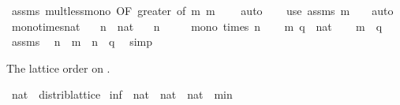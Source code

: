 \begin{isabellebody}
\ assms\ mult{\isacharunderscore}{\kern0pt}less{\isacharunderscore}{\kern0pt}mono{}\ {\isacharbrackleft}{\kern0pt}OF\ greater{\isacharcomma}{\kern0pt}\ of\ m{\isacharbrackright}{\kern0pt}\ {\isacartoucheopen}m\ {\isasymnoteq}\ {}{\isacartoucheclose}\ \isamarkupfalse%
\ auto\isanewline
\ \ \isamarkupfalse%
\ {\isacharparenleft}{\kern0pt}use\ assms\ {\isacartoucheopen}m\ {\isasymnoteq}\ {}{\isacartoucheclose}\ \ auto{\isacharparenright}{\kern0pt}\isanewline
{}\isamarkupfalse%
%
\endisatagproof
{\isafoldproof}%
%
\isadelimproof
\isanewline
%
\endisadelimproof
\isanewline
{}\isamarkupfalse%
\ mono{\isacharunderscore}{\kern0pt}times{\isacharunderscore}{\kern0pt}nat{\isacharcolon}{\kern0pt}\isanewline
\ \ \ n\ {\isacharcolon}{\kern0pt}{\isacharcolon}{\kern0pt}\ nat\isanewline
\ \ \ {\isachardoublequoteopen}n\ {\isachargreater}{\kern0pt}\ {}{\isachardoublequoteclose}\isanewline
\ \ \ {\isachardoublequoteopen}mono\ {\isacharparenleft}{\kern0pt}times\ n{\isacharparenright}{\kern0pt}{\isachardoublequoteclose}\isanewline
%
\isadelimproof
%
\endisadelimproof
%
\isatagproof
{}\isamarkupfalse%
\isanewline
\ \ \isamarkupfalse%
\ m\ q\ {\isacharcolon}{\kern0pt}{\isacharcolon}{\kern0pt}\ nat\isanewline
\ \ \isamarkupfalse%
\ {\isachardoublequoteopen}m\ {\isasymle}\ q{\isachardoublequoteclose}\isanewline
\ \ \isamarkupfalse%
\ assms\ \isamarkupfalse%
\ {\isachardoublequoteopen}n\ {\isacharasterisk}{\kern0pt}\ m\ {\isasymle}\ n\ {\isacharasterisk}{\kern0pt}\ q{\isachardoublequoteclose}\ \isamarkupfalse%
\ simp\isanewline
{}\isamarkupfalse%
%
\endisatagproof
{\isafoldproof}%
%
\isadelimproof
%
\endisadelimproof
%
\begin{isamarkuptext}%
The lattice order on .%
\end{isamarkuptext}\isamarkuptrue%
\isamarkupfalse%
\ nat\ {\isacharcolon}{\kern0pt}{\isacharcolon}{\kern0pt}\ distrib{\isacharunderscore}{\kern0pt}lattice\isanewline
{}\isanewline
\isanewline
{}\isamarkupfalse%
\ {\isachardoublequoteopen}{\isacharparenleft}{\kern0pt}inf\ {\isacharcolon}{\kern0pt}{\isacharcolon}{\kern0pt}\ nat\ {\isasymRightarrow}\ nat\ {\isasymRightarrow}\ nat{\isacharparenright}{\kern0pt}\ {\isacharequal}{\kern0pt}\ min{\isachardoublequoteclose}\isanewline
\isanewline

\end{isabellebody}
